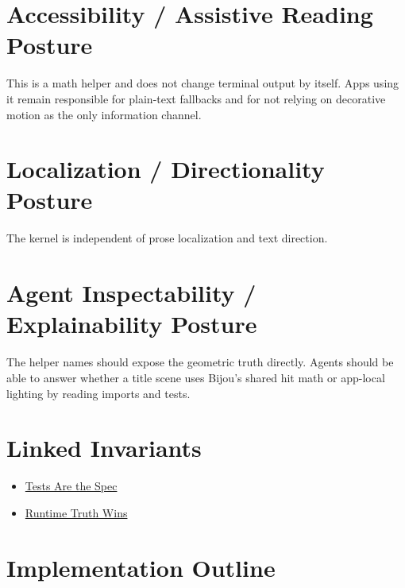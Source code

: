 \section{Accessibility / Assistive Reading Posture}\label{record-159-accessibility-assistive-reading-posture}

This is a math helper and does not change terminal output by itself. Apps using it remain responsible for plain-text fallbacks and for not relying on decorative motion as the only information channel.

\section{Localization / Directionality Posture}\label{record-159-localization-directionality-posture}

The kernel is independent of prose localization and text direction.

\section{Agent Inspectability / Explainability Posture}\label{record-159-agent-inspectability-explainability-posture}

The helper names should expose the geometric truth directly. Agents should be able to answer whether a title scene uses Bijou's shared hit math or app-local lighting by reading imports and tests.

\section{Linked Invariants}\label{record-159-linked-invariants}

\begin{itemize}
\tightlist
\item
  \href{https://github.com/flyingrobots/bijou/blob/cbd70612140e7a450d764b3c7be1c6af878b99bc/docs/invariants/tests-are-the-spec.md}{Tests Are the Spec}
\item
  \href{https://github.com/flyingrobots/bijou/blob/cbd70612140e7a450d764b3c7be1c6af878b99bc/docs/invariants/runtime-truth-wins.md}{Runtime Truth Wins}
\end{itemize}

\section{Implementation Outline}\label{record-159-implementation-outline}

